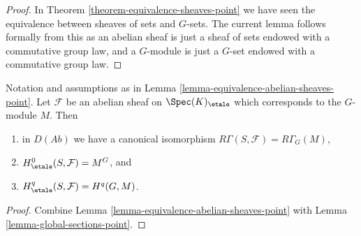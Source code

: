 \begin{proof}
In
Theorem \ref{theorem-equivalence-sheaves-point}
we have seen the equivalence between sheaves of sets and $G$-sets.
The current lemma follows formally from this as an abelian sheaf is just
a sheaf of sets endowed with a commutative group law, and a $G$-module
is just a $G$-set endowed with a commutative group law.
\end{proof}

\begin{lemma}
\label{lemma-compare-cohomology-point}
Notation and assumptions as in
Lemma \ref{lemma-equivalence-abelian-sheaves-point}.
Let $\mathcal{F}$ be an abelian sheaf on $\Spec(K)_\etale$
which corresponds to the $G$-module $M$.
Then
\begin{enumerate}
\item in $D(\textit{Ab})$ we have a canonical isomorphism
$R\Gamma(S, \mathcal{F}) = R\Gamma_G(M)$,
\item $H_\etale^0(S, \mathcal{F}) = M^G$, and
\item $H_\etale^q(S, \mathcal{F}) = H^q(G, M)$.
\end{enumerate}
\end{lemma}

\begin{proof}
Combine
Lemma \ref{lemma-equivalence-abelian-sheaves-point}
with
Lemma \ref{lemma-global-sections-point}.
\end{proof}


